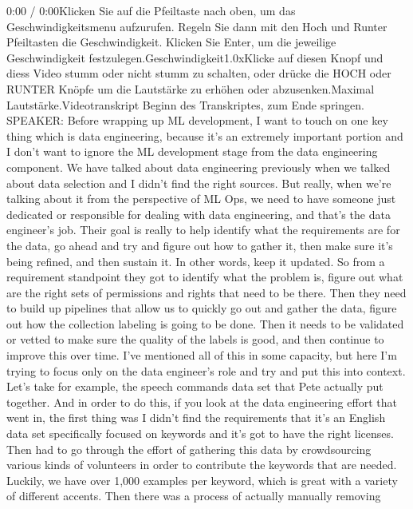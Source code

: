 {{    0:00 / 0:00Klicken Sie auf die Pfeiltaste nach oben, um das Geschwindigkeitsmenu aufzurufen. Regeln Sie dann mit den Hoch und Runter Pfeiltasten die Geschwindigkeit. Klicken Sie Enter, um die jeweilige Geschwindigkeit festzulegen.Geschwindigkeit1.0xKlicke auf diesen Knopf und diess Video stumm oder nicht stumm zu schalten, oder drücke die HOCH oder RUNTER Knöpfe um die Lautstärke zu erhöhen oder abzusenken.Maximal Lautstärke.Videotranskript
    Beginn des Transkriptes, zum Ende springen.
    SPEAKER: Before wrapping up ML development,
    I want to touch on one key thing which is data engineering, because it's
    an extremely important portion and I don't want to ignore the ML development
    stage from the data engineering component.
    We have talked about data engineering previously
    when we talked about data selection and I didn't find the right sources.
    But really, when we're talking about it from the perspective of ML Ops,
    we need to have someone just dedicated or responsible
    for dealing with data engineering, and that's the data engineer's job.
    Their goal is really to help identify what the requirements are for the data,
    go ahead and try and figure out how to gather it,
    then make sure it's being refined, and then sustain it.
    In other words, keep it updated.
    So from a requirement standpoint they got
    to identify what the problem is, figure out what
    are the right sets of permissions and rights that need to be there.
    Then they need to build up pipelines that
    allow us to quickly go out and gather the data,
    figure out how the collection labeling is going to be done.
    Then it needs to be validated or vetted to make sure the quality of the labels
    is good, and then continue to improve this over time.
    I've mentioned all of this in some capacity,
    but here I'm trying to focus only on the data engineer's role
    and try and put this into context.
    Let's take for example, the speech commands
    data set that Pete actually put together.
    And in order to do this, if you look at the data engineering effort that
    went in, the first thing was I didn't find the requirements that it's
    an English data set specifically focused on keywords
    and it's got to have the right licenses.
    Then had to go through the effort of gathering this data by crowdsourcing
    various kinds of volunteers in order to contribute
    the keywords that are needed.
    Luckily, we have over 1,000 examples per keyword,
    which is great with a variety of different accents.
    Then there was a process of actually manually removing
}}
